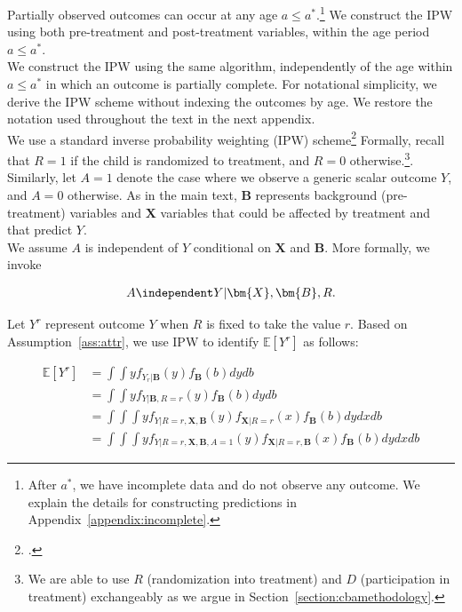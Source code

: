 \noindent Partially observed outcomes can occur at any age $a \leq a^*$.\footnote{After $a^*$, we have incomplete data and do not observe any outcome. We explain the details for constructing predictions in Appendix~\ref{appendix:incomplete}.} We construct the IPW using both pre-treatment and post-treatment variables, within the age period  $a \leq a^*$.\\

\noindent We construct the IPW using the same algorithm, independently of the age within $a \leq a^*$ in which an outcome is partially complete. For notational simplicity, we derive the IPW scheme without indexing the outcomes by age. We restore the notation used throughout the text in the next appendix.\\

\noindent We use a standard inverse probability weighting (IPW) scheme\footnote{\citet{Horvitz_Thompson_1952_JASA}.} Formally, recall that $R = 1$ if the child is randomized to treatment, and $R = 0$ otherwise.\footnote{We are able to use $R$ (randomization into treatment) and $D$ (participation in treatment) exchangeably as we argue in Section~\ref{section:cbamethodology}.}. Similarly, let $A = 1$ denote the case where we observe a generic scalar outcome $Y$, and $A = 0$ otherwise. As in the main text, $\bm{B}$ represents background (pre-treatment) variables and $\bm{X}$ variables that could be affected by treatment and that predict $Y$.\\

\noindent We assume $A$ is independent of $Y$ conditional on $\bm{X}$ and $\bm{B}$. More formally, we invoke

\begin{assumption} \label{ass:attr}
	\begin{align*}
		A \independent Y | \bm{X}, \bm{B}, R.
	\end{align*}
\end{assumption}

\noindent Let $Y^{r}$ represent outcome $Y$ when $R$ is fixed to take the value $r$. Based on Assumption~\ref{ass:attr}, we use IPW to identify $\mathbb{E}[Y^r]$ as follows:

\begin{align} \label{eq:case2}
\mathbb{E}[Y^r] & = \int \int y f_{ Y_ r| \bm{B} } (y) f_{\bm{B}} (b) dydb \\ \nonumber
	           & = \int \int y f_{Y| \bm{B}, R=r}(y) f_{\bm{B}} (b) dydb \\ \nonumber
	           & = \int \int \int y f_{Y|R=r,\bm{X}, \bm{B}} (y) f_{\bm{X} | R=r} (x) f_{\bm{B}} (b) dydxdb \\ \nonumber
				& = \int \int \int y f_{Y|R=r,\bm{X}, \bm{B}, A=1} (y) f_{\bm{X} | R=r, \bm{B} }(x) f_{\bm{B}} (b) dydxdb
\end{align}

